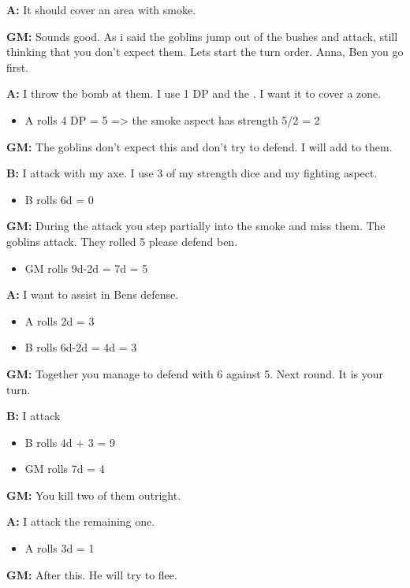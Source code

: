 \documentclass[11pt]{article}
\begin{document}
{\textbf{A:} It should cover an area with smoke. 

\textbf{GM:} Sounds good. As i said the goblins jump out of the bushes and attack, still thinking that you don't expect them. Lets start the turn order. Anna, Ben you go first. 

\textbf{A:} I throw the bomb at them. I use 1 DP and the . I want it to cover a zone.
\begin{itemize}
\item A rolls 4 DP = 5 => the smoke aspect has strength 5/2 = 2
\end{itemize}

\textbf{GM:} The goblins don't expect this and don't try to defend. I will add  to them.

\textbf{B:} I attack with my axe. I use 3 of my strength dice and my fighting aspect.
\begin{itemize}
\item B rolls 6d = 0
\end{itemize}

\textbf{GM:} During the attack you step partially into the smoke and miss them. The goblins attack. They rolled 5 please defend ben.
\begin{itemize}
\item GM rolls 9d-2d = 7d = 5
\end{itemize}

\textbf{A:} I want to assist in Bens defense.
\begin{itemize}
\item A rolls 2d = 3
\item B rolls 6d-2d = 4d = 3
\end{itemize}

\textbf{GM:} Together you manage to defend with 6 against 5. Next round. It is your turn.

\textbf{B:} I attack
\begin{itemize}
\item B rolls 4d + 3 = 9
\item GM rolls 7d = 4
\end{itemize}

\textbf{GM:} You kill two of them outright.

\textbf{A:} I attack the remaining one.
\begin{itemize}
\item A rolls 3d = 1
\end{itemize}

\textbf{GM:} After this. He will try to flee.

}
\end{document}
